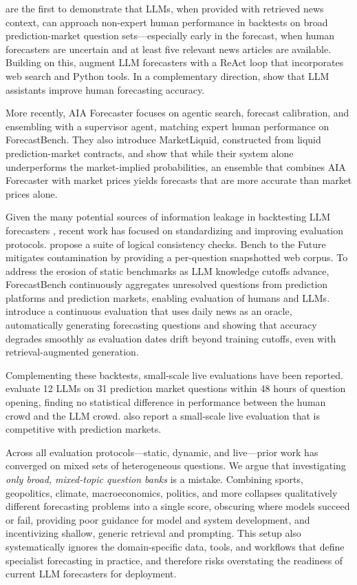 \documentclass{article}
\theoremstyle{plain}
\theoremstyle{definition}
\theoremstyle{remark}
\begin{document}
\citet{halawi2024approaching} are the first to demonstrate that LLMs, when provided with retrieved news context, can approach non-expert human performance in backtests on broad prediction-market question sets—especially early in the forecast, when human forecasters are uncertain and at least five relevant news articles are available. Building on this, \citet{hsieh2024reasoning} augment LLM forecasters with a ReAct \cite{yao2022react} loop that incorporates web search and Python tools. 
In a complementary direction, \citet{schoen2025augmented} show that LLM assistants improve human forecasting accuracy.

More recently, AIA Forecaster \cite{alur2025aia} focuses on agentic search, forecast calibration, and ensembling with a supervisor agent, matching expert human performance on ForecastBench. They also introduce MarketLiquid, constructed from liquid prediction-market contracts, and show that while their system alone underperforms the market-implied probabilities, an ensemble that combines AIA Forecaster with market prices yields forecasts that are more accurate than market prices alone.

Given the many potential sources of information leakage in backtesting LLM forecasters \cite{paleka2025pitfalls}, recent work has focused on standardizing and improving evaluation protocols. \citet{sudhir2024consistency} propose a suite of logical consistency checks. Bench to the Future \cite{wildman2025bench} mitigates contamination by providing a per-question snapshotted web corpus. To address the erosion of static benchmarks as LLM knowledge cutoffs advance, ForecastBench \cite{kargerforecastbench} continuously aggregates unresolved questions from prediction platforms and prediction markets, enabling evaluation of humans and LLMs. \citet{daillms} introduce a continuous evaluation that uses daily news as an oracle, automatically generating forecasting questions and showing that accuracy degrades smoothly as evaluation dates drift beyond training cutoffs, even with retrieval-augmented generation.

Complementing these backtests, small-scale live evaluations have been reported. \citet{schoen2024wisdom} evaluate 12 LLMs on 31 prediction market questions within 48 hours of question opening, finding no statistical difference in performance between the human crowd and the LLM crowd. \citet{alur2025aia} also report a small-scale live evaluation that is competitive with prediction markets.

Across all evaluation protocols—static, dynamic, and live—prior work has converged on mixed sets of heterogeneous questions. We argue that investigating \emph{only broad, mixed-topic question banks} is a mistake. Combining sports, geopolitics, climate, macroeconomics, politics, and more collapses qualitatively different forecasting problems into a single score, obscuring where models succeed or fail, providing poor guidance for model and system development, and incentivizing shallow, generic retrieval and prompting. This setup also systematically ignores the domain-specific data, tools, and workflows that define specialist forecasting in practice, and therefore risks overstating the readiness of current LLM forecasters for deployment.
\end{document}
